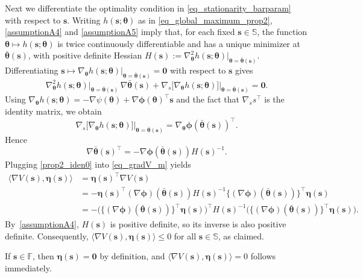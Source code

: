 \documentclass{article}
\newcommand{\zero}{\ensuremath{\mathbf{0}}}
\def\phib        {{\sbmm{\phi}}\XS}        \def\Phib       {{\sbmm{\Phi}}\XS}
\def\XS{\xspace}
\def\sbmm#1{\ensuremath{\boldsymbol{#1}}}
\def\eqdef{:=}
\def\param{\vtheta}
\def\barparam{\bar{\param}}
\def\lyap{V}
\def\rvs{{\mathbf{s}}}
\def\veta{{\bm{\eta}}}
\def\vtheta{{\bm{\theta}}}
\def\vs{{\bm{s}}}
\def\sF{{\mathbb{F}}}
\def\sS{{\mathbb{S}}}
\begin{document}
Next we differentiate the optimality condition in \cref{eq_stationarity_barparam}
with respect to $\vs$.
Writing \(h(\vs;\vtheta)\) as in \cref{eq_global_maximum_prop2}, \cref{assumptionA4} and \cref{assumptionA5}
imply that, for each fixed $\vs \in \sS$, the function
\(\vtheta \mapsto h(\vs;\vtheta)\) is twice continuously differentiable and has a
unique minimizer at $\barparam(\vs)$, with positive definite Hessian
\(H(\vs) \eqdef \nabla_\vtheta^2 h(\vs;\vtheta)\vert_{\vtheta = \barparam(\vs)}\).
Differentiating \(\rvs \mapsto \nabla_\vtheta h(\vs;\vtheta)\vert_{\vtheta=\barparam(\vs)} = \zero\) with respect to \(\rvs\) gives
\[
  \nabla_\vtheta^2 h(\vs;\vtheta)\big\vert_{\vtheta=\barparam(\vs)}\, \nabla \barparam(\vs)
  + \nabla_s \big[\nabla_\vtheta h(\vs;\vtheta)\big]\big\vert_{\vtheta=\barparam(\vs)} = \zero.
\]
Using
\(
  \nabla_\vtheta h(\vs;\vtheta) = -\nabla \psi(\vtheta) + \nabla \phib(\vtheta)^\top \vs
\)
and the fact that \(\nabla_s s^\top\) is the identity matrix, we obtain
\[
  \nabla_s \big[\nabla_\vtheta h(\vs;\vtheta)\big]\big\vert_{\vtheta=\barparam(\vs)}
  = \nabla_\vtheta \phib(\barparam(\vs))^\top.
\]
Hence 
\begin{equation}
  \label{prop2_iden0}
  \nabla \barparam(\vs)^\top
  = -\nabla \phib(\barparam(\vs))
    H(\vs)^{-1}.
\end{equation}
Plugging \cref{prop2_iden0} into \cref{eq_gradV_m} yields
\begin{align}
  \label{eq_prop2_desired_result}
  \langle \nabla \lyap(\vs), \veta(\vs)\rangle
  &= \veta(\vs)^\top \nabla \lyap(\vs) \nonumber\\
  &= -\veta(\vs)^\top (\nabla \phib)(\barparam(\vs))  H(\vs)^{-1}
     \{(\nabla \phib)(\barparam(\vs)) \}^\top  \veta(\vs) \nonumber\\
  &= -\Big( \{(\nabla \phib)(\barparam(\vs)) \}^\top \veta(\vs)\Big)^\top
     H(\vs)^{-1}
     \Big( \{(\nabla \phib)(\barparam(\vs))\}^\top \veta(\vs)\Big).
\end{align}
By~\cref{assumptionA4},
$H(\vs)$ is positive definite,
so its inverse is also positive definite. Consequently,
\(\langle \nabla \lyap(\vs), \veta(\vs)\rangle \le 0\) for all \(\vs \in \sS\), as claimed.


 If \(\vs \in \sF\), then \(\veta(\vs) =\zero\) by definition, and
\(\langle \nabla \lyap(\vs), \veta(\vs)\rangle = 0\) follows immediately.
\end{document}
